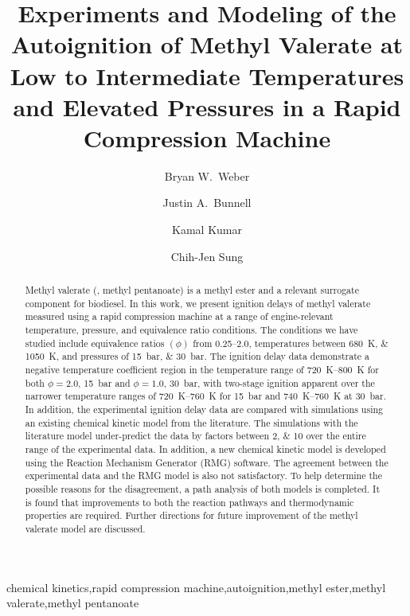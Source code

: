 \documentclass[letterpaper, review, sort&compress]{elsarticle}
\begin{document}
\begin{frontmatter}
\title{ Experiments and Modeling of the Autoignition of Methyl Valerate at Low to Intermediate Temperatures and Elevated Pressures in a Rapid Compression Machine }

\author[uconn]{Bryan W.\ Weber}
\author[uconn]{Justin A.\ Bunnell}
\author[idaho]{Kamal Kumar}
\author[uconn]{Chih-Jen Sung}
\address[uconn]{Department of Mechanical Engineering, University of Connecticut, Storrs, CT, USA}
\address[idaho]{Department of Mechanical Engineering, University of Idaho, Moscow, ID, USA}

\begin{abstract} %

    Methyl valerate (, methyl pentanoate) is a methyl ester and a relevant surrogate
    component for biodiesel. In this work, we present ignition delays of methyl valerate measured
    using a rapid compression machine at a range of engine-relevant temperature, pressure, and
    equivalence ratio conditions. The conditions we have studied include equivalence ratios
    \((\phi)\) from \numrange{0.25}{2.0}, temperatures between \SIlist{680;1050}{\K}, and pressures
    of \SIlist{15;30}{\bar}. The ignition delay data demonstrate a negative temperature coefficient
    region in the temperature range of \SIrange[range-phrase={--}]{720}{800}{\K} for both
    \(\phi=2.0\), \SI{15}{\bar} and \(\phi=1.0\), \SI{30}{\bar}, with two-stage ignition apparent
    over the narrower temperature ranges of \SIrange[range-phrase={--}]{720}{760}{\K} for
    \SI{15}{\bar} and \SIrange[range-phrase={--}]{740}{760}{\K} at \SI{30}{\bar}. In addition, the
    experimental ignition delay data are compared with simulations using an existing chemical
    kinetic model from the literature. The simulations with the literature model under-predict the
    data by factors between \numlist{2;10} over the entire range of the experimental data. In
    addition, a new chemical kinetic model is developed using the Reaction Mechanism Generator (RMG)
    software. The agreement between the experimental data and the RMG model is also not
    satisfactory. To help determine the possible reasons for the disagreement, a path analysis of
    both models is completed. It is found that improvements to both the reaction pathways and
    thermodynamic properties are required. Further directions for future improvement of the methyl
    valerate model are discussed.

\end{abstract}

\begin{keyword}
    chemical kinetics\sep rapid compression machine\sep autoignition\sep methyl ester\sep methyl valerate\sep methyl pentanoate
\end{keyword}
\end{frontmatter}
\end{document}
